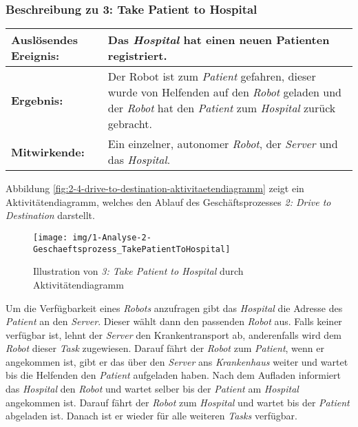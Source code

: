 			\subsubsection*{Beschreibung zu 3: Take Patient to Hospital}

			\begin{table}[H]
				\centering
				\begin{tabularx}{\textwidth}{@{}p{3cm}X@{}}
				\toprule
				\textbf{Auslösendes Ereignis:} & Das \emph{Hospital} hat einen neuen Patienten registriert.\\ \midrule
				\textbf{Ergebnis:} & Der Robot ist zum \emph{Patient} gefahren, dieser wurde von Helfenden auf den \emph{Robot} geladen 
				und der \emph{Robot} hat den \emph{Patient} zum \emph{Hospital} zurück gebracht.\\ \midrule
				\textbf{Mitwirkende:} &	Ein einzelner, autonomer \emph{Robot}, der \emph{Server} und das \emph{Hospital}. \\
				\bottomrule
				\end{tabularx}
				\label{tab:2-4-drive-to-destination}
			\end{table}

			Abbildung \ref{fig:2-4-drive-to-destination-aktivitaetendiagramm} zeigt ein Aktivitätendiagramm, welches den Ablauf des Geschäftsprozesses \emph{2: Drive to Destination} darstellt.

			\begin{figure}[H]
				\centering
				\texttt{[image: img/1-Analyse-2-Geschaeftsprozess\_TakePatientToHospital]}
				\caption{Illustration von \emph{3: Take Patient to Hospital} durch Aktivitätendiagramm}
				\label{fig:2-4-take-patient-to-hospital-aktivitaetendiagramm}
			\end{figure}

			Um die Verfügbarkeit eines \emph{Robots} anzufragen gibt das \emph{Hospital} die Adresse des \emph{Patient} an den \emph{Server}. Dieser wählt dann den passenden \emph{Robot} aus. Falls keiner verfügbar ist, lehnt der \emph{Server} den Krankentransport ab, anderenfalls wird dem \emph{Robot} dieser \emph{Task} zugewiesen. Darauf fährt der \emph{Robot} zum \emph{Patient}, wenn er angekommen ist, gibt er das über den \emph{Server} ans \emph{Krankenhaus} weiter und wartet bis die Helfenden den \emph{Patient} aufgeladen haben. Nach dem Aufladen informiert das \emph{Hospital} den \emph{Robot} und wartet selber bis der \emph{Patient} am \emph{Hospital} angekommen ist. Darauf fährt der \emph{Robot} zum \emph{Hospital} und wartet bis der \emph{Patient} abgeladen ist. Danach ist er wieder für alle weiteren \emph{Tasks} verfügbar.

	\pagebreak

	